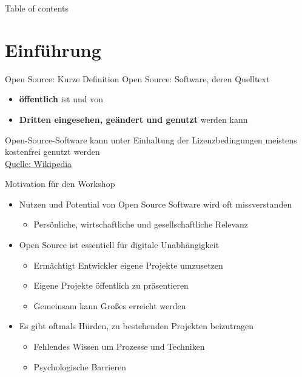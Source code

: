\documentclass[compress,aspectratio=169]{beamer}
\begin{document}
\begin{frame}[plain]
	\titlepage
\end{frame}

\begin{frame}[t]{Table of contents}
  \tableofcontents[subsectionstyle=hide/hide]
\end{frame}


\section{Einführung}

\begin{frame}{Open Source: Kurze Definition}
  Open Source: Software, deren Quelltext 
  \begin{itemize}
    \item \textbf{öffentlich} ist und von 
    \item \textbf{Dritten eingesehen, geändert und genutzt} werden kann
  \end{itemize}
  Open-Source-Software kann unter Einhaltung der Lizenzbedingungen meistens kostenfrei genutzt werden \\
  \hfill \href{https://de.wikipedia.org/wiki/Open_Source}{Quelle: Wikipedia}
\end{frame}

\begin{frame}{Motivation für den Workshop}
  \begin{itemize}
    \item Nutzen und Potential von Open Source Software wird oft missverstanden
      \begin{itemize}
        \item Persönliche, wirtschaftliche und gesellschaftliche Relevanz
      \end{itemize}
    \item Open Source ist essentiell für digitale Unabhängigkeit 
    \begin{itemize}
      \item Ermächtigt Entwickler eigene Projekte umzusetzen 
      \item Eigene Projekte öffentlich zu präsentieren
      \item Gemeinsam kann Großes erreicht werden
    \end{itemize}
    \item Es gibt oftmals Hürden, zu bestehenden Projekten beizutragen
    \begin{itemize}
      \item Fehlendes Wissen um Prozesse und Techniken
      \item Psychologische Barrieren
    \end{itemize}
  \end{itemize}
\end{frame}
\end{document}
